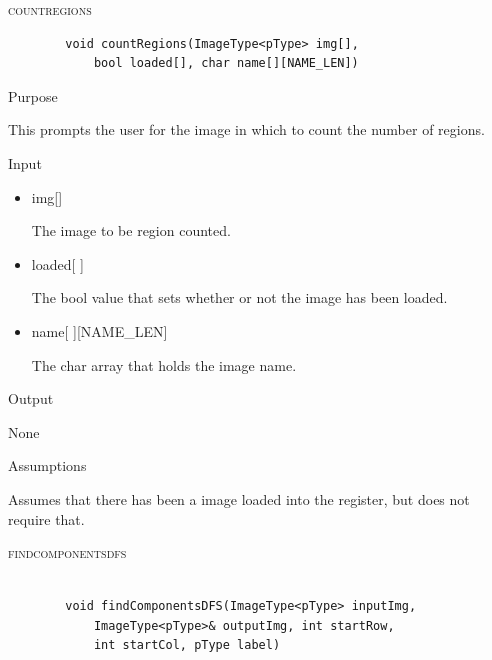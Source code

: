 \documentclass[pdftex, 11pt]{article}
\begin{document}
\begin{description}

	\item{\textsc{countregions}}

		\begin{lstlisting}
		void countRegions(ImageType<pType> img[], 
			bool loaded[], char name[][NAME_LEN])
		\end{lstlisting}

		\begin{description}
			\item{Purpose}
				
				This prompts the user for the image in which to
				count the number of regions.

			\item{Input}
				
				\begin{itemize}

					\item{img[]}

						The image to be region counted.

					\item{loaded[ ]}

						The bool value that sets whether
						or not the image has been
						loaded.

					\item{name[ ][NAME_LEN]}

						The char array that holds the
						image name.

				\end{itemize}

			\item{Output}
				
				None

			\item{Assumptions}

				Assumes that there has been a image loaded into
				the register, but does not require that. 


		\end{description}

	\item{\textsc{findcomponentsdfs}}

		\begin{lstlisting}

		void findComponentsDFS(ImageType<pType> inputImg, 
			ImageType<pType>& outputImg, int startRow,
			int startCol, pType label)
		\end{lstlisting}


\end{description}
\end{document}

